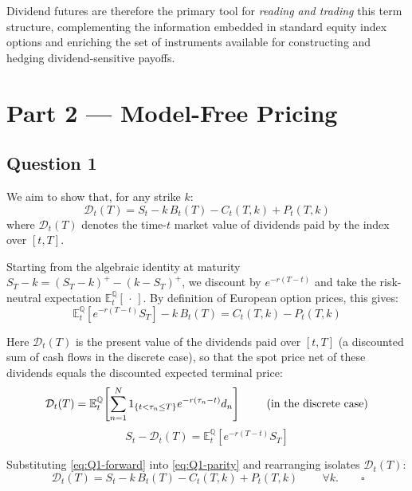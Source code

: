 \documentclass[12pt,a4paper]{article}
\begin{document}
Dividend futures are therefore the primary tool for \emph{reading and trading} this
term structure, complementing the information embedded in standard equity index options
and enriching the set of instruments available for constructing and hedging
dividend-sensitive payoffs.

\newpage

\section*{Part 2 --- Model-Free Pricing}

\subsection*{Question 1}

We aim to show that, for any strike $k$:
\begin{equation*}
\mathcal{D}_t(T) = S_t - k\,B_t(T) - C_t(T,k) + P_t(T,k)
\end{equation*}
where $\mathcal{D}_t(T)$ denotes the time-$t$ market value of dividends paid by the index over $[t, T]$.

Starting from the algebraic identity at maturity $S_T - k = (S_T - k)^+ - (k - S_T)^+$, we discount by $e^{-r(T-t)}$ and take the risk-neutral expectation $\mathbb{E}^{\mathbb{Q}}_{t}[\,\cdot\,]$. By definition of European option prices, this gives:
\begin{equation}
\mathbb{E}^{\mathbb{Q}}_{t}\!\left[e^{-r(T-t)}S_T\right] - k\,B_t(T) = C_t(T,k) - P_t(T,k) \label{eq:Q1-parity}
\end{equation}

Here $\mathcal{D}_t(T)$ is the present value of the dividends paid over $[t,T]$ (a discounted sum of cash flows in the discrete case), so that the spot price net of these dividends equals the discounted expected terminal price:
\[
\mathcal{D}_t(T) = \mathbb{E}^{\mathbb{Q}}_{t}\!\left[\sum_{n=1}^{N} {1}_{\{t < \tau_n \leq T\}} e^{-r(\tau_n - t)} d_n\right] \hspace{0.8cm} \text{(in the discrete case)}
\]
\begin{equation}
S_t - \mathcal{D}_t(T) = \mathbb{E}^{\mathbb{Q}}_{t}\!\left[e^{-r(T-t)}S_T\right] \label{eq:Q1-forward}
\end{equation}

Substituting \eqref{eq:Q1-forward} into \eqref{eq:Q1-parity} and rearranging isolates $\mathcal{D}_t(T)$:
\begin{equation*}
\boxed{\,\mathcal{D}_t(T) = S_t - k\,B_t(T) - C_t(T,k) + P_t(T,k)\,} \qquad \forall k. \qquad \square
\end{equation*}
\end{document}
